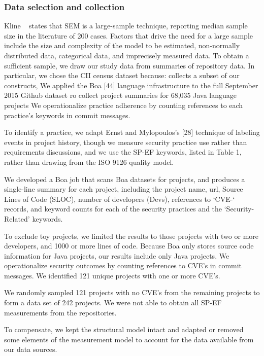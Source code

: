 \subsubsection{Data selection and collection}

Kline ~\cite{kline2015principles} states that SEM is a large-sample technique, reporting median sample size in the literature of 200 cases.  Factors that drive the need for a large sample include the size and complexity of the model to be estimated, non-normally distributed data, categorical data, and imprecisely measured data. To obtain a sufficient sample, we draw our study data from summaries of repository data. In particular, we chose the CII census dataset
	because: collects a subset of our constructs, 
We applied the Boa [44] language infrastructure to the full September 2015 Github dataset ro collect project summaries for 68,035 Java language projects We operationalize practice adherence by counting references to each practice’s keywords in commit messages. 

To identify a practice, we adapt Ernst and Mylopoulos’s [28] technique of labeling events in project history, though we measure security practice use rather than requirements discussions, and we use the SP-EF keywords, listed in Table 1, rather than drawing from the ISO 9126 quality model. 

We developed a Boa job  that scans Boa datasets for projects, and produces a single-line summary for each project, including the project name, url, Source Lines of Code (SLOC), number of developers (Devs), references to ‘CVE-‘ records, and keyword counts for each of the security practices and the ‘Security-Related’ keywords.  

To exclude toy projects, we limited the results to those projects with two or more developers, and 1000 or more lines of code.  Because Boa only stores source code information for Java projects, our results include only Java projects. We operationalize security outcomes by counting references to CVE’s in commit messages.  We identified 121 unique projects with one or more CVE’s. 

We randomly sampled 121 projects with no CVE’s from the remaining projects to form a data set of 242 projects.
We were not able to obtain all SP-EF measurements from the repositories. 

To compensate, we kept the structural model intact and adapted or removed some elements of the measurement model to account for the data available from our data sources. 

